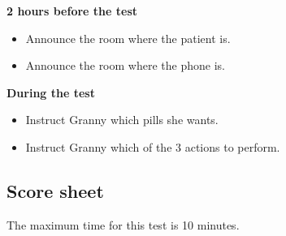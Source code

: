 \textbf{2 hours before the test}
\begin{itemize}
	\item Announce the room where the patient is.
	\item Announce the room where the phone is.
\end{itemize}

\textbf{During the test}
\begin{itemize}
	\item Instruct Granny which pills she wants.
	\item Instruct Granny which of the 3 actions to perform.
\end{itemize}

\newpage 
\subsection{Score sheet}

The maximum time for this test is 10 minutes.

